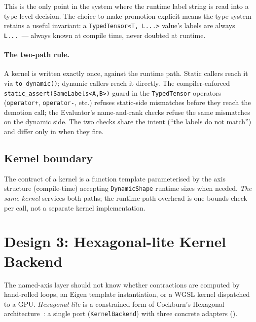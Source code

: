 \documentclass[10pt,twocolumn]{article}
\newcommand{\code}[1]{\texttt{#1}}
\begin{document}
This is the only point in the system where the runtime label string
is read into a type-level decision. The choice to make promotion
explicit means the type system retains a useful invariant: a
\code{TypedTensor<T, L...>} value's labels are always
\code{L...}~--- always known at compile time, never doubted at
runtime.

\paragraph{The two-path rule.}
A kernel is written exactly once, against the runtime path. Static
callers reach it via \code{to\_dynamic()}; dynamic callers reach it
directly. The compiler-enforced \code{static\_assert(SameLabels<A,B>)}
guard in the \code{TypedTensor} operators (\code{operator+},
\code{operator-}, etc.) refuses static-side mismatches before they
reach the demotion call; the Evaluator's name-and-rank checks refuse
the same mismatches on the dynamic side. The two checks share the
intent (``the labels do not match'') and differ only in when they
fire.

\subsection{Kernel boundary}

The contract of a kernel is a function template parameterised by the
axis structure (compile-time) accepting \code{DynamicShape} runtime
sizes when needed. \emph{The same kernel} services both paths; the
runtime-path overhead is one bounds check per call, not a separate
kernel implementation.

\section{Design 3: Hexagonal-lite Kernel Backend}
\label{sec:hex-lite}


The named-axis layer should not know whether contractions are computed
by hand-rolled loops, an Eigen template instantiation, or a WGSL
kernel dispatched to a GPU. \emph{Hexagonal-lite} is a constrained
form of Cockburn's Hexagonal architecture~\cite{cockburn-hexagonal}: a single port
(\code{KernelBackend}) with three concrete adapters
().
\end{document}
